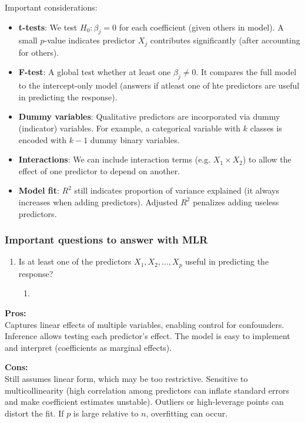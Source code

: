 \documentclass[11pt]{article}
\begin{document}
\noindent Important considerations:
\begin{itemize}
  \item \textbf{t-tests}: We test $H_0:\beta_j=0$ for each coefficient (given others in model). A small $p$-value indicates predictor $X_j$ contributes significantly (after accounting for others).
  \item \textbf{F-test}: A global test whether at least one $\beta_j \neq 0$. It compares the full model to the intercept-only model (answers if atleast one of hte predictors are useful in predicting the response).
  \item \textbf{Dummy variables}: Qualitative predictors are incorporated via dummy (indicator) variables. For example, a categorical variable with $k$ classes is encoded with $k-1$ dummy binary variables.
  \item \textbf{Interactions}: We can include interaction terms (e.g. $X_1 \times X_2$) to allow the effect of one predictor to depend on another.
  \item \textbf{Model fit}: $R^2$ still indicates proportion of variance explained (it always increases when adding predictors). Adjusted $R^2$ penalizes adding useless predictors.
\end{itemize} \phantom{i}

\subsubsection{Important questions to answer with MLR}
\begin{enumerate}
    \item Is at least one of the predictors $X_1,X_2,...,X_p$ useful in predicting the response?
        \begin{enumerate}
            \item 
        \end{enumerate}
\end{enumerate}

\noindent \textbf{Pros:} \\
\noindent Captures linear effects of multiple variables, enabling control for confounders. Inference allows testing each predictor’s effect. The model is easy to implement and interpret (coefficients as marginal effects).

\noindent \textbf{Cons:} \\
\noindent Still assumes linear form, which may be too restrictive. Sensitive to multicollinearity (high correlation among predictors can inflate standard errors and make coefficient estimates unstable). Outliers or high-leverage points can distort the fit. If $p$ is large relative to $n$, overfitting can occur.
\end{document}
